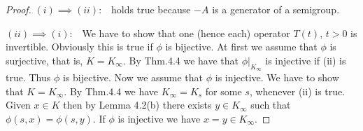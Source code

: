 %
\begin{proof}
	$(i)\implies(ii)$:\ \  holds true because $-A$ is a generator of a semigroup.
	
	$(ii)\implies(i)$:\ \ 
	We have to show that one (hence each) operator $T(t)$, $t > 0$ is invertible.
	Obviously this is true if $\phi$ is bijective.
	At first we assume that $\phi$ is surjective, that is, $K = K_{\infty}$.
	By Thm.4.4 we have that $\phi|_{K_{\infty}}$ is injective if (ii) is true.
	Thus $\phi$ is bijective.
	Now we assume that $\phi$ is injective.
	We have to show that $K = K_{\infty}$.
	By Thm.4.4 we have $K_{\infty} = K_{s}$ for some $s$, whenever (ii) is true.
	Given $x \in K$ then by Lemma 4.2(b) there exists $y \in K_{\infty}$ such that $\phi(s,x) = \phi(s,y)$.
	If $\phi$ is injective we have $x = y \in K_{\infty}$.
\end{proof}
